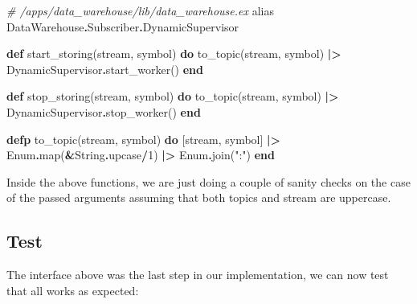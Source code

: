 \documentclass[
  oneside]{book}
\newenvironment{Shaded}{\begin{snugshade}}{\end{snugshade}}
\newcommand{\CommentTok}[1]{\textcolor[rgb]{0.56,0.35,0.01}{\textit{#1}}}
\newcommand{\ConstantTok}[1]{\textcolor[rgb]{0.00,0.00,0.00}{#1}}
\newcommand{\DecValTok}[1]{\textcolor[rgb]{0.00,0.00,0.81}{#1}}
\newcommand{\ImportTok}[1]{#1}
\newcommand{\KeywordTok}[1]{\textcolor[rgb]{0.13,0.29,0.53}{\textbf{#1}}}
\newcommand{\NormalTok}[1]{#1}
\newcommand{\OperatorTok}[1]{\textcolor[rgb]{0.81,0.36,0.00}{\textbf{#1}}}
\newcommand{\StringTok}[1]{\textcolor[rgb]{0.31,0.60,0.02}{#1}}
\begin{document}
\begin{Shaded}
\begin{Highlighting}[]
  \CommentTok{\# /apps/data\_warehouse/lib/data\_warehouse.ex}
  \ImportTok{alias} \ConstantTok{DataWarehouse}\OperatorTok{.}\ConstantTok{Subscriber}\OperatorTok{.}\ConstantTok{DynamicSupervisor}

  \KeywordTok{def}\NormalTok{ start\_storing(stream, symbol) }\KeywordTok{do}
\NormalTok{    to\_topic(stream, symbol)}
    \OperatorTok{|\textgreater{}} \ConstantTok{DynamicSupervisor}\OperatorTok{.}\NormalTok{start\_worker()}
  \KeywordTok{end}

  \KeywordTok{def}\NormalTok{ stop\_storing(stream, symbol) }\KeywordTok{do}
\NormalTok{    to\_topic(stream, symbol)}
    \OperatorTok{|\textgreater{}} \ConstantTok{DynamicSupervisor}\OperatorTok{.}\NormalTok{stop\_worker()}
  \KeywordTok{end}

  \KeywordTok{defp}\NormalTok{ to\_topic(stream, symbol) }\KeywordTok{do}
\NormalTok{    [stream, symbol]}
    \OperatorTok{|\textgreater{}} \ConstantTok{Enum}\OperatorTok{.}\NormalTok{map(}\OperatorTok{\&}\ConstantTok{String}\OperatorTok{.}\NormalTok{upcase}\OperatorTok{/}\DecValTok{1}\NormalTok{)}
    \OperatorTok{|\textgreater{}} \ConstantTok{Enum}\OperatorTok{.}\NormalTok{join(}\StringTok{":"}\NormalTok{)}
  \KeywordTok{end}
\end{Highlighting}
\end{Shaded}

Inside the above functions, we are just doing a couple of sanity checks on the case of the passed arguments assuming that both topics and stream are uppercase.

\hypertarget{test}{%
\subsection{Test}\label{test}}

The interface above was the last step in our implementation, we can now test that all works as expected:
\end{document}
